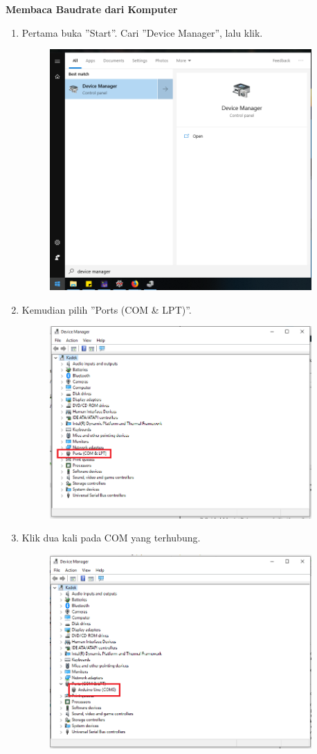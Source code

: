 \hfill \break
\textbf{Membaca Baudrate dari Komputer}
\begin{enumerate}
	\item Pertama buka ''Start''. Cari ''Device Manager'', lalu klik.
	\begin{figure}[H]
		\includegraphics[width=10cm]{figures/5/1174006/Teori/d1.png}
		\centering
	\end{figure}
	
	\item Kemudian pilih ''Ports (COM \& LPT)''.
	\begin{figure}[H]
		\includegraphics[width=10cm]{figures/5/1174006/Teori/d3.png}
		\centering
	\end{figure}
	
	\item Klik dua kali pada COM yang terhubung.
	\begin{figure}[H]
		\includegraphics[width=10cm]{figures/5/1174006/Teori/d2.png}
		\centering
	\end{figure}


\end{enumerate}
